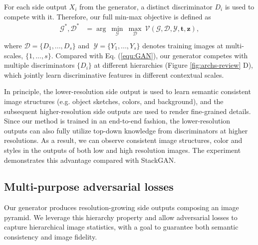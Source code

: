 \documentclass[10pt,twocolumn,letterpaper]{article}
\begin{document}
For each side output $X_i$ from the generator, a distinct discriminator $D_i$ is used to compete with it. Therefore, our full min-max objective is defined as 
\begin{equation}
\label{equ:optim}
\begin{split}
  \mathcal{G}^*, \mathcal{D}^*&  =  \arg~\underset{\mathcal{G}}{\min}\ \underset{\mathcal{D}}{\max}~ \mathcal{V}(\mathcal{G},\mathcal{D}, \mathcal{Y}, \bm t, \bm z), \\
\end{split}
\end{equation}
where $\mathcal{D} = \{D_1, ..., D_s\} $ and $\; \mathcal{Y} = \{Y_1, ..., Y_s\}$ denotes training images at multi-scales, $\{1,...,s\}$.
Compared with Eq. (\ref{equ:GAN}), our generator competes with multiple discriminators $\{D_i\}$ at different hierarchies (Figure \ref{fig:archs-review} D), which jointly learn discriminative features in different contextual scales.

In principle, the lower-resolution side output is used to learn semantic consistent image structures (e.g. object sketches, colors, and background), and the subsequent higher-resolution side outputs are used to render fine-grained details. Since our method is trained in an end-to-end fashion, the lower-resolution outputs can also fully utilize top-down knowledge from discriminators at higher resolutions. As a result, we can observe consistent image structures, color and styles in the outputs of both low and high resolution images. The experiment demonstrates this advantage compared with StackGAN. 


\subsection{Multi-purpose adversarial losses}
Our generator produces resolution-growing side outputs composing an image pyramid. 
We leverage this hierarchy property and allow adversarial losses to capture hierarchical image statistics, with a goal to guarantee both semantic consistency and image fidelity. 
\end{document}
